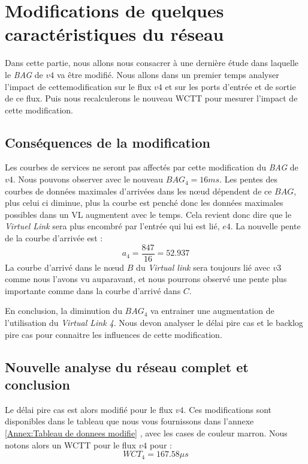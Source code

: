 \chapter{Modifications de quelques caractéristiques du réseau}
Dans cette partie, nous allons nous consacrer à une dernière étude dans laquelle le \emph{BAG} de $v4$ va être modifié. Nous allons dans un premier temps analyser l'impact de cettemodification sur le flux $v4$ et sur les ports d'entrée et de sortie de ce flux. Puis nous recalculerons le nouveau WCTT pour mesurer l'impact de cette modification.

\section{Conséquences de la modification}
Les courbes de services ne seront pas affectés par cette modification du \emph{BAG} de $v4$. Nous pouvons observer avec le nouveau $BAG_4 = 16ms$. Les pentes des courbes de données maximales d'arrivées dans les nœud dépendent de ce $BAG$, plus celui ci diminue, plus la courbe est penché donc les données maximales possibles dans un VL augmentent avec le temps. Cela revient donc  dire que le \emph{Virtuel Link} sera plus encombré par l'entrée qui lui est lié, $e4$. La nouvelle pente de la courbe d'arrivée est :
\begin{equation}
a_4 = \frac{847}{16} = 52.937
\end{equation}
La courbe d'arrivé dans le nœud $B$ du \emph{Virtual link} sera toujours lié avec $v3$ comme nous l'avons vu auparavant, et nous pourrons observé une pente plus importante comme dans la courbe d'arrivé dans $C$. 

En conclusion, la diminution du $BAG_4$ va entrainer une augmentation de l'utilisation du \emph{Virtual Link 4}. Nous devon analyser le délai pire cas et le backlog pire cas pour connaitre les influences de cette modification.

\section{Nouvelle analyse du réseau complet et conclusion} 
Le délai pire cas est alors modifié pour le flux $v4$. Ces modifications sont disponibles dans le tableau que nous vous fournissons dans l'annexe \ref{Annex:Tableau de donnees modifie} , avec les cases de couleur marron. Nous notons alors un WCTT pour le flux $v4$ pour :\begin{equation}
WCT_4 = 167.58\mu s
\end{equation}

